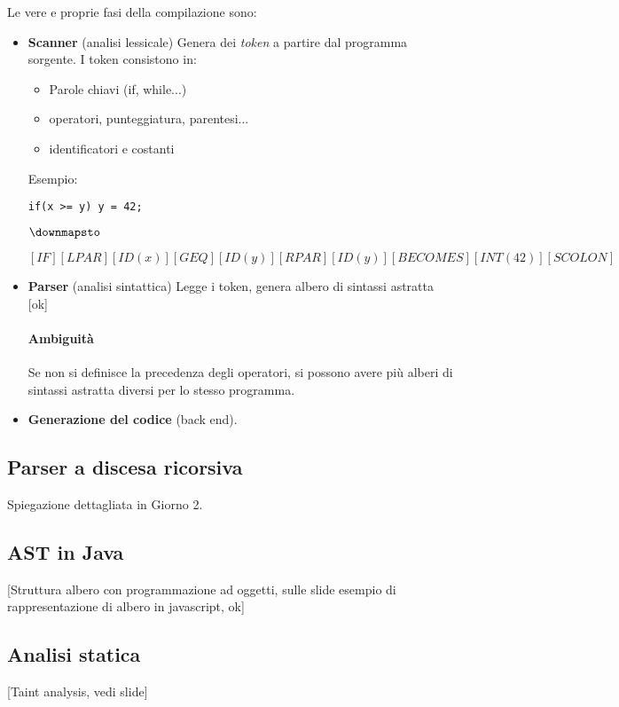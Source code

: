 \documentclass[a4paper,10pt]{article}
\begin{document}
Le vere e proprie fasi della compilazione sono:
\begin{itemize}
 \item \textbf{Scanner} (analisi lessicale) Genera dei \emph{token} a partire dal programma sorgente. I token consistono in: 
 \begin{itemize}
  \item Parole chiavi (if, while...)
  \item operatori, punteggiatura, parentesi...
  \item identificatori e costanti
 \end{itemize}
Esempio:
\begin{center}
 \texttt{if(x >= y) y = 42;} 
 
 $\downmapsto$ 
 
 $[IF][LPAR][ID(x)][GEQ][ID(y)][RPAR][ID(y)][BECOMES][INT(42)][SCOLON]$
\end{center}

 \item \textbf{Parser} (analisi sintattica) Legge i token, genera albero di sintassi astratta [ok]
 
 \paragraph{Ambiguità}
Se non si definisce la precedenza degli operatori, si possono avere più alberi di sintassi astratta diversi per lo stesso programma.
\item \textbf{Generazione del codice} (back end).
\end{itemize}

\subsection{Parser a discesa ricorsiva}
Spiegazione dettagliata in Giorno 2.

\subsection{AST in Java}
[Struttura albero con programmazione ad oggetti, sulle slide esempio di rappresentazione di albero in javascript, ok]
\subsection{Analisi statica}
[Taint analysis, vedi slide]
\end{document}
